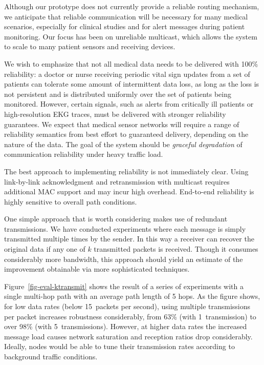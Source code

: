 Although our prototype does not currently provide a reliable routing
mechanism, we anticipate that reliable communication will be necessary
for many medical scenarios, especially for clinical studies and for
alert messages during patient monitoring. Our focus has been
on unreliable multicast, which allows the system to scale to many
patient sensors and receiving devices.

We wish to emphasize that not all medical data needs to be delivered
with 100\% reliability: a doctor or nurse receiving periodic vital
sign updates from a set of patients can tolerate some amount of
intermittent data loss, as long as the loss is not persistent and is
distributed uniformly over the set of patients being monitored.
However, certain signals, such as alerts from critically ill patients
or high-resolution EKG traces, must be delivered with stronger
reliability guarantees. We expect that medical sensor networks will
require a range of reliability semantics from best effort to
guaranteed delivery, depending on the nature of the data. The goal of
the system should be {\em graceful degradation} of communication
reliability under heavy traffic load.

The best approach to implementing reliability is not immediately
clear. Using link-by-link acknowledgment and retransmission with
multicast requires additional MAC support and may incur high overhead.
End-to-end reliability is highly sensitive to overall path conditions.

One simple approach that is worth considering makes use of redundant
transmissions.
We have conducted experiments where each message is
simply transmitted multiple times by the sender. In this way a
receiver can recover the original data if any one of $k$ transmitted
packets is received. Though it consumes considerably more bandwidth,
this approach should yield an estimate of the improvement obtainable
via more sophisticated techniques.

Figure~\ref{fig-eval-ktransmit} shows the result of a series of
experiments with a single multi-hop path with an average path length
of 5 hops. As the figure shows, for low data rates (below 15~packets
per second), using multiple transmissions per packet increases
robustness considerably, from 63\% (with 1~transmission) to over 98\%
(with 5~transmissions). However, at higher data rates the increased
message load causes network saturation and reception ratios drop
considerably. Ideally, nodes would be able to tune their transmission
rates according to background traffic conditions.

